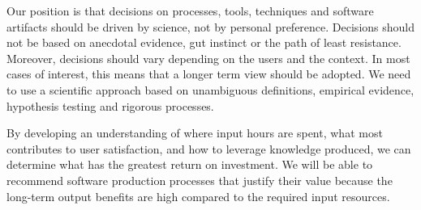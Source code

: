 \documentclass[sigconf, authorversion, nonacm]{acmart}
\begin{document}
Our position is that decisions on processes, tools, techniques and software
artifacts should be driven by science, not by personal preference.  Decisions
should not be based on anecdotal evidence, gut instinct or the path of least
resistance.  Moreover, decisions should vary depending on the users and the
context.  In most cases of interest, this means that a longer term view should
be adopted.  We need to use a scientific approach based on unambiguous
definitions, empirical evidence, hypothesis testing and rigorous processes.

By developing an understanding of where input hours are spent, what most
contributes to user satisfaction, and how to leverage knowledge produced,
we can determine what has the greatest return on investment.  We will be able
to recommend software production processes that justify their value because the
long-term output benefits are high compared to the required input resources.  




\end{document}
